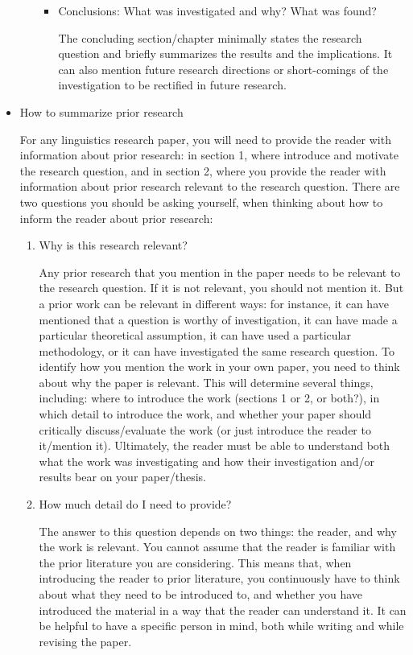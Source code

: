 \documentclass[11pt,fleqn,a4paper/thesis]{article}
\newcommand{\6}{\mbox{$[\hspace*{-.6mm}[$}}
\newcommand{\9}{\mbox{$]\hspace*{-.6mm}]$}}
\begin{document}
\begin{itemize}[itemsep=-1pt,leftmargin=2.5ex,topsep=-2pt]
\begin{enumerate}
\begin{itemize}[leftmargin=2.5ex,topsep=-2pt]
\item Conclusions: What was investigated and why? What was found?

The concluding section/chapter minimally states the research question and briefly summarizes the results and the implications. It can also mention future research directions or short-comings of the investigation to be rectified in future research. 

\end{itemize}

\end{enumerate}

\item How to summarize prior research

For any linguistics research paper, you will need to provide the reader with information about prior research: in section 1, where introduce and motivate the research question,  and in section 2, where you provide the reader with information about prior research relevant to the research question. There are two questions you should be asking yourself, when thinking about how to inform the reader about prior research:

\begin{enumerate}

\item Why is this research relevant?

Any prior research that you mention in the paper needs to be relevant to the research question. If it is not relevant, you should not mention it. But a prior work can be relevant in different ways: for instance, it can have mentioned that a question is worthy of investigation, it can have made a particular theoretical assumption, it can have used a particular methodology, or it can have investigated the same research question. To identify how you mention the work in your own paper, you need to think about why the paper is relevant. This will determine several things, including: where to introduce the work (sections 1 or 2, or both?), in which detail to introduce the work, and whether your paper should critically discuss/evaluate the work (or just introduce the reader to it/mention it). Ultimately, the reader must be able to understand both what the work was investigating and how their investigation and/or results bear on your paper/thesis.

\item How much detail do I need to provide?

The answer to this question depends on two things: the reader, and why the work is relevant. You cannot assume that the reader is familiar with the prior literature you are considering. This means that, when introducing the reader to prior literature, you continuously have to think about what they need to be introduced to, and whether you have introduced the material in a way that the reader can understand it. It can be helpful to have a specific person in mind, both while writing and while revising the paper. 


\end{enumerate}
\end{itemize}
\end{document}

